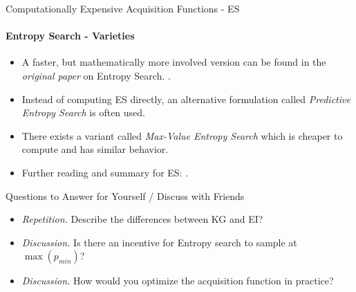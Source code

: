 \begin{frame}[c]{Computationally Expensive Acquisition Functions - ES}
\framesubtitle{Entropy Search - Varieties}
\begin{itemize}
    \item<+-> A faster, but mathematically more involved version can be found in the \emph{original paper} on Entropy Search. .
    \item<+-> Instead of computing ES directly, an alternative formulation called \emph{Predictive Entropy Search} is often used. 
    \item<+-> There exists a variant called \emph{Max-Value Entropy Search} which is cheaper to compute and has similar behavior. 
    \item<+-> Further reading and summary for ES: .
\end{itemize}
\end{frame}
\begin{frame}[c]{Questions to Answer for Yourself / Discuss with Friends}
\begin{itemize}
    \item \emph{Repetition.} Describe the differences between KG and EI?
    \item \emph{Discussion.} Is there an incentive for Entropy search to sample at $\max(p_{min})$? 
    \item \emph{Discussion.} How would you optimize the acquisition function in practice?
\end{itemize}
\end{frame}
